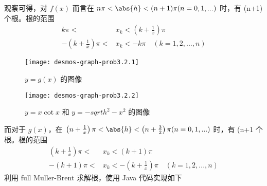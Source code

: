 \documentclass[UTF8]{ctexart}
\begin{document}
    观察可得，对 \(f(x)\) 而言在 \(n \pi < \abs{h} < (n+1) \pi (n = 0, 1, ...)\) 时，有 \2(n+1)\) 个根。根的范围
    \begin{equation}
        \begin{aligned}
            k \pi <  & x_k < \left(k + \frac{1}{x}\right) \pi \\
            -\left(k + \frac{1}{x}\right) \pi < & x_k < -k \pi \quad (k = 1, 2, ... , n)
        \end{aligned}
        \label{eq:equation3.1}
    \end{equation}
    \begin{figure}[h]
        \centering
        \texttt{[image: desmos-graph-prob3.2.1]}
        \caption{\(y = g(x)\) 的图像}\label{fig:figure3.3}
    \end{figure}
    \begin{figure}[h]
        \centering
        \texttt{[image: desmos-graph-prob3.2.2]}
        \caption{\(y = x \cot{x}\) 和 \(y = -sqrt{h^2 - x^2}\) 的图像}\label{fig:figure3.4}
    \end{figure}
    而对于 \(g(x)\)，在 \(\left( n + \frac{1}{x} \right) \pi < \abs{h} < \left(n+\frac{3}{2}\right) \pi (n = 0, 1, ...)\) 时，有 \2(n+1\) 个根。根的范围
    \begin{equation}
        \begin{aligned}
            \left( k + \frac{1}{x} \right) \pi < & x_k < (k + 1) \pi \\
            -(k + 1) \pi < & x_k < -\left( k + \frac{1}{x} \right) \pi \quad (k = 1, 2, ..., n)
        \end{aligned}\label{eq:equation3.2}
    \end{equation}
    利用 full Muller-Brent 求解根，使用 Java 代码实现如下
\end{document}
